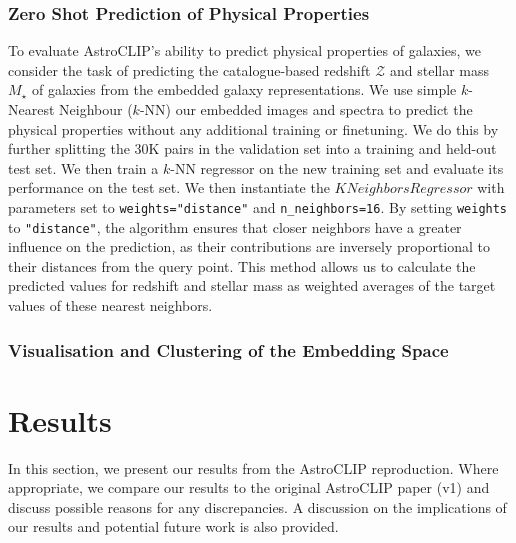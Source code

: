 \documentclass[a4paper,12pt]{article}
\begin{document}
\subsubsection*{Zero Shot Prediction of Physical Properties}
To evaluate AstroCLIP's ability to predict physical properties of galaxies, we consider the task of predicting the catalogue-based redshift $\mathcal{Z}$ and stellar mass $M_{\star}$ of galaxies from the embedded galaxy representations. We use simple $k$-Nearest Neighbour ($k$-NN) our embedded images and spectra to predict the physical properties without any additional training or finetuning.  We do this by further splitting the 30K pairs in the validation set into a training and held-out test set. We then train a $k$-NN regressor on the new training set and evaluate its performance on the test set. We then instantiate the $KNeighborsRegressor$ with parameters set to \texttt{weights="distance"} and \texttt{n\_neighbors=16}. By setting \texttt{weights} to \texttt{"distance"}, the algorithm ensures that closer neighbors have a greater influence on the prediction, as their contributions are inversely proportional to their distances from the query point. This method allows us to calculate the predicted values for redshift and stellar mass as weighted averages of the target values of these nearest neighbors.

\subsubsection*{Visualisation and Clustering of the Embedding Space}


\section{Results}
In this section, we present our results from the AstroCLIP reproduction. Where appropriate, we compare our results to the original AstroCLIP paper (v1) \cite{astroclip} and discuss possible reasons for any discrepancies. A discussion on the implications of our results and potential future work is also provided.
\end{document}
